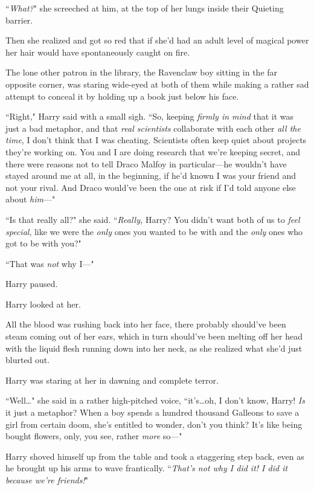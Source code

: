``\emph{What?}" she screeched at him, at the top of her lungs inside their Quieting barrier.

Then she realized and got so red that if she'd had an adult level of magical power her hair would have spontaneously caught on fire.

The lone other patron in the library, the Ravenclaw boy sitting in the far opposite corner, was staring wide-eyed at both of them while making a rather sad attempt to conceal it by holding up a book just below his face.

``Right," Harry said with a small sigh. ``So, keeping \emph{firmly in mind} that it was just a bad metaphor, and that \emph{real scientists} collaborate with each other \emph{all the time}, I don't think that I was cheating. Scientists often keep quiet about projects they're working on. You and I are doing research that we're keeping secret, and there were reasons not to tell Draco Malfoy in particular—he wouldn't have stayed around me at all, in the beginning, if he'd known I was your friend and not your rival. And Draco would've been the one at risk if I'd told anyone else about \emph{him}—"

``Is that really all?" she said. ``\emph{Really,} Harry? You didn't want both of us to \emph{feel special}, like we were the \emph{only} ones you wanted to be with and the \emph{only} ones who got to be with you?"

``That was \emph{not} why I—"

Harry paused.

Harry looked at her.

All the blood was rushing back into her face, there probably should've been steam coming out of her ears, which in turn should've been melting off her head with the liquid flesh running down into her neck, as she realized what she'd just blurted out.

Harry was staring at her in dawning and complete terror.

``Well…" she said in a rather high-pitched voice, ``it's…oh, I don't know, Harry! \emph{Is} it just a metaphor? When a boy spends a hundred thousand Galleons to save a girl from certain doom, she's entitled to wonder, don't you think? It's like being bought flowers, only, you see, rather \emph{more} so—"

Harry shoved himself up from the table and took a staggering step back, even as he brought up his arms to wave frantically. ``\emph{That's not why I did it! I did it because we're friends!}"

